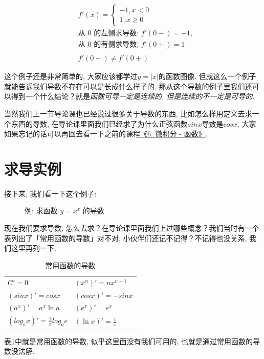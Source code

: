 \begin{align*}
  & f'(x) = \begin{cases} -1, x<0 \\ 1, x \geq 0 \end{cases} \\
  & \mbox{从 0 的左侧求导数: } f'(0-) = -1, \\ 
  & \mbox{从 0 的有侧求导数: } f'(0+) = 1 \\ \\
  & f'(0-) \neq f'(0+)
\end{align*}

这个例子还是非常简单的, 大家应该都学过$y=|x|$的函数图像. 但就这么一个例子就能告诉我们导数不存在可以是长成什么样子的. 那从这个导数的例子里我们还可以得到一个什么结论？就是\textit{函数可导一定是连续的, 但是连续的不一定是可导的}. 

当然我们上一节导论课也已经说过很多关于导数的东西, 比如怎么样用定义去求一个东西的导数, 在导论课里面我们已经求了为什么正弦函数$sinx$导数是$cosx$, 大家如果忘记的话可以再回去看一下之前的课程\hyperlink{6.微积分-函数}{《6. 微积分 - 函数》}. 

\section{求导实例}

接下来, 我们看一下这个例子: 

\begin{figure}[ht]
  \centering
  \Large{例: 求函数 $y=x^x$ 的导数}
\end{figure}

现在我们要求导数, 怎么去求？在导论课里面我们上过哪些概念？我们当时有一个表列出了「常用函数的导数」对不对, 小伙伴们还记不记得？不记得也没关系, 我们这里再列一下.

\begin{table}
  \centering
  \begin{tabular}{ll}
    \midrule
      $C' = 0$ & $(x^n)' = nx^{n-1}$ \\
      $(sinx)' = cosx$ & $(cosx)' = -sinx$ \\
      $(a^x)' = a^x \ln a$ & $(e^x)' = e^x$ \\
      $(log_a{x})' = \frac{1}{x}log_a{e}$ &  $(\ln x)' = \frac{1}{x}$ \\
    \bottomrule
  \end{tabular}
  \caption{常用函数的导数}
  \label{fig:table10_1}
\end{table}

表\ref{fig:table10_1}中就是常用函数的导数, 似乎这里面没有我们可用的, 也就是通过常用函数的导数没法解. 

